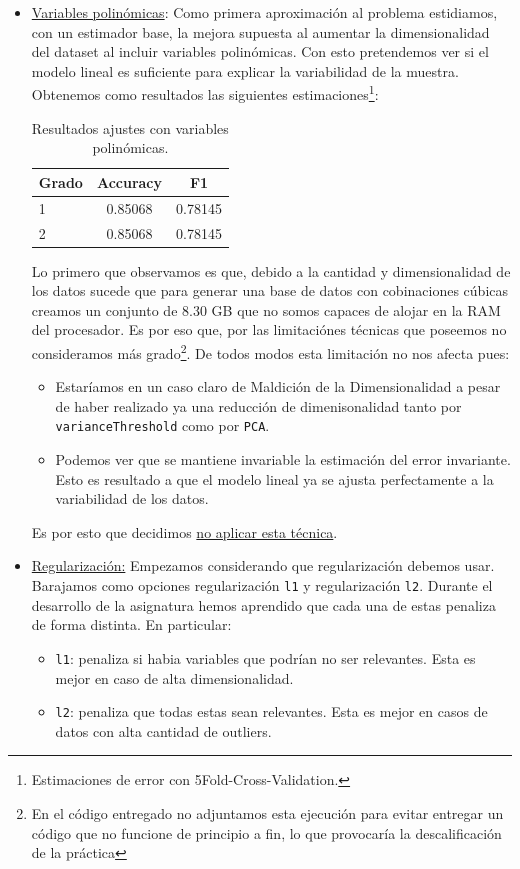 \documentclass[11pt,a4paper]{article}
\begin{document}
\begin{itemize}
\item \underline{Variables polinómicas}: Como primera aproximación al problema estidiamos, con un estimador base, la mejora supuesta al aumentar la dimensionalidad del dataset al incluir variables polinómicas. Con esto pretendemos ver si el modelo lineal es suficiente para explicar la variabilidad de la muestra. Obtenemos como resultados las siguientes estimaciones\footnote{Estimaciones de error con  5Fold-Cross-Validation.}:

\begin{table}[h]
\begin{center}
\begin{tabular}{|l|c|c|}
\hline
	Grado & Accuracy & F1 \\ \hline
1 & 0.85068 & 0.78145 \\
2 & 0.85068 & 0.78145  \\\hline
\end{tabular}
\caption{Resultados ajustes con variables polinómicas.}

\end{center}
\end{table}

Lo primero que observamos es que, debido a la cantidad y dimensionalidad de los datos sucede que para generar una base de datos con cobinaciones cúbicas creamos un conjunto de 8.30 GB que no somos capaces de alojar en la RAM del procesador. Es por eso que, por las limitaciónes técnicas que poseemos no consideramos más grado\footnote{En el código entregado no adjuntamos esta ejecución para evitar entregar un código que no funcione de principio a fin, lo que provocaría la descalificación de la práctica}. De todos modos esta limitación no nos afecta pues:
\begin{itemize}
	\item Estaríamos en un caso claro de Maldición de la Dimensionalidad\cite{maldim} a pesar de haber realizado ya una reducción de dimenisonalidad tanto por \texttt{varianceThreshold} como por \texttt{PCA}.
	\item Podemos ver que se mantiene invariable la estimación del error invariante. Esto es resultado a que el modelo lineal ya se ajusta perfectamente a la variabilidad de los datos. 
\end{itemize}

Es por esto que decidimos \underline{no aplicar esta técnica}.
\item \underline{Regularización:} Empezamos considerando que regularización debemos usar. Barajamos como opciones regularización \texttt{l1} y regularización \texttt{l2}. Durante el desarrollo de la asignatura hemos aprendido que cada una de estas penaliza de forma distinta. En particular:
  \begin{itemize}
  \item \texttt{l1}: penaliza si habia variables que podrían no ser relevantes. Esta es mejor en caso de alta dimensionalidad.
  \item \texttt{l2}: penaliza que todas estas sean relevantes. Esta es mejor en casos de datos con alta cantidad de outliers.
  \end{itemize}


\end{itemize}
\end{document}
